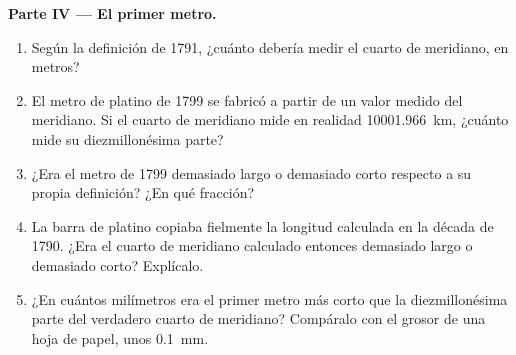 \begin{problem}
\medskip
\noindent\textbf{Parte IV --- El primer metro.}
\begin{enumerate}[resume]
  \item Según la definición de 1791, ¿cuánto debería medir el cuarto de
        meridiano, en metros?
  \item El metro de platino de 1799 se fabricó a partir de un valor medido
        del meridiano. Si el cuarto de meridiano mide en realidad
        \qty{10001.966}{km}, ¿cuánto mide su diezmillonésima parte?
  \item ¿Era el metro de 1799 demasiado largo o demasiado corto respecto a
        su propia definición? ¿En qué fracción?
  \item La barra de platino copiaba fielmente la longitud calculada en la
        década de 1790. ¿Era el cuarto de meridiano calculado entonces
        demasiado largo o demasiado corto? Explícalo.
  \item ¿En cuántos milímetros era el primer metro más corto que la
        diezmillonésima parte del verdadero cuarto de meridiano? Compáralo con
        el grosor de una hoja de papel, unos \qty{0.1}{mm}.
\end{enumerate}
\end{problem}
